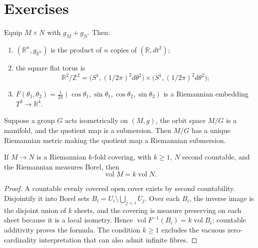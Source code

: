 \section{Exercises}

\begin{remark}
  \label{rem:pet-ch1-ex-1}
  \leanok
  Equip $M\times N$ with $g_M+g_N$. Then:
  \begin{enumerate}
    \item $(\mathbb{R}^n,g_{\mathbb{R}^n})$ is the product of $n$ copies of
      $(\mathbb{R},dt^2)$;
    \item the square flat torus is
      \[
        \mathbb{R}^2/\mathbb{Z}^2
          =\big(S^1,(1/2\pi)^2d\theta^2\big)
             \times\big(S^1,(1/2\pi)^2d\theta^2\big);
      \]
    \item
      $F(\theta_1,\theta_2)=\frac1{2\pi}
        (\cos\theta_1,\sin\theta_1,\cos\theta_2,\sin\theta_2)$
      is a Riemannian embedding $T^2\to\mathbb{R}^4$.
  \end{enumerate}
\end{remark}

\begin{remark}
  \label{rem:pet-ch1-ex-2}
  \leanok
  Suppose a group $G$ acts isometrically on $(M,g)$, the orbit space $M/G$ is
  a manifold, and the quotient map is a submersion. Then $M/G$ has a unique
  Riemannian metric making the quotient map a Riemannian submersion.
\end{remark}

\begin{remark}
  \label{rem:pet-ch1-ex-3}
  \leanok
  If $M\to N$ is a Riemannian $k$-fold covering, with $k\ge1$, $N$ second
  countable, and the Riemannian measures Borel, then
  \[
    \operatorname{vol}M=k\operatorname{vol}N.
  \]
\end{remark}
\begin{proof}
  \leanok
  \sketch
  A countable evenly covered open cover exists by second countability.
  Disjointify it into Borel sets
  $B_i=U_i\setminus\bigcup_{j<i}U_j$. Over each $B_i$, the inverse image is
  the disjoint union of $k$ sheets, and the covering is measure preserving on
  each sheet because it is a local isometry. Hence
  $\operatorname{vol}F^{-1}(B_i)=k\operatorname{vol}B_i$; countable
  additivity proves the formula. The condition $k\ge1$ excludes the vacuous
  zero-cardinality interpretation that can also admit infinite fibres.
\end{proof}


